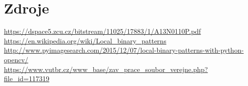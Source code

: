 \documentclass{report}
\begin{document}
\chapter{Zdroje}
\url{https://dspace5.zcu.cz/bitstream/11025/17883/1/A13N0110P.pdf} \\
\url{https://en.wikipedia.org/wiki/Local_binary_patterns} \\
\url{http://www.pyimagesearch.com/2015/12/07/local-binary-patterns-with-python-opencv/} \\
\url{https://www.vutbr.cz/www_base/zav_prace_soubor_verejne.php?file_id=117319} \\
\end{document}
